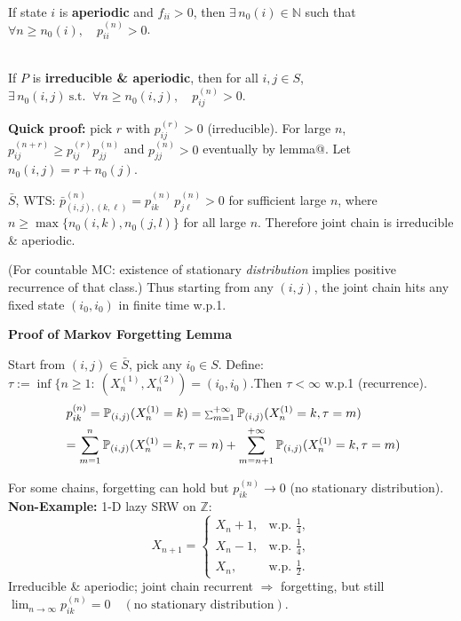 \documentclass[a4paper, landscape]{article}
\newcommand{\topic}[1]{\par\medskip\textbf{#1}\par}
\newcommand{\subtopic}[1]{\par\textbf{#1}}
\newcommand{\smallsum}{\mathop{\scalebox{0.65}{$\sum$}}\nolimits}
\renewcommand{\topic}[1]{\par\medskip\noindent\colorbox{highlightcolor}{\parbox{\dimexpr\columnwidth-2\fboxsep\relax}{\textbf{#1}}}\par}
\renewcommand{\subtopic}[1]{\par\textbf{\color{blue}{#1}}} %
\begin{document}
\begin{multicols}{4}
\subtopic{Lemma@ (eventual return positivity):}\\
If state $i$ is \textbf{aperiodic} and $f_{ii}>0$, then $\exists\, n_0(i)\in\mathbb N$ such that $\forall n\ge n_0(i),\quad p^{(n)}_{ii}>0$.

\subtopic{Corollary@ (eventual positivity between two states):}\\
If $P$ is \textbf{irreducible \& aperiodic}, then for all $i,j\in S$,\\
$\exists\, n_0(i,j)\ \text{s.t. }\ \forall n\ge n_0(i,j),\quad p^{(n)}_{ij}>0.$

\textbf{Quick proof:} pick $r$ with $p^{(r)}_{ij}>0$ (irreducible). For large $n$,
$p^{(n+r)}_{ij}\ge p^{(r)}_{ij}p^{(n)}_{jj}$ and $p^{(n)}_{jj}>0$ eventually by lemma@. Let $n_0(i,j)=r+n_0(j)$.

\subtopic{For joint chain:} $\bar S$, WTS: $\bar p^{(n)}_{(i,j),(k,\ell)} = p^{(n)}_{ik}\,p^{(n)}_{j\ell}>0$ for sufficient large $n$, where $n\geq\max\{n_0(i,k), n_0(j,l)\}$ for all large $n$. Therefore joint chain is irreducible \& aperiodic.
\subtopic{Key step: joint chain has stationary $\bar\pi$ $\Rightarrow$ recurrence:}
(For countable MC: existence of stationary \emph{distribution} implies positive recurrence of that class.) Thus starting from any $(i,j)$, the joint chain hits any fixed state $(i_0,i_0)$ in finite time w.p.1.

\topic{Proof of Markov Forgetting Lemma}
Start from $(i,j) \in \bar S$, pick any $i_0 \in S$. Define: $\tau := \inf\{n\ge 1:\ (X^{(1)}_n,X^{(2)}_n)=(i_0,i_0).$Then $\tau<\infty$ w.p.1 (recurrence).
\begin{align*}
&\;p_{ik}^{(n)}
=\mathbb P_{(i,j)}(X_n^{(1)}=k)    =\smallsum_{m=1}^{+\infty}\mathbb P_{(i,j)}(X_n^{(1)}=k,\tau=m)\\
&=\sum_{m=1}^{n}\mathbb P_{(i,j)}(X_n^{(1)}=k,\tau=n)+\sum_{m=n+1}^{+\infty}\mathbb P_{(i,j)}(X_n^{(1)}=k,\tau=m)
\end{align*}
\vspace{6cm}

\subtopic{Why we need $\exists\,\pi$:}
For some chains, forgetting can hold but $p^{(n)}_{ik}\to 0$ (no stationary distribution).\\
\textbf{Non-Example:} 1-D lazy SRW on $\mathbb Z$:
\[
X_{n+1}=
\begin{cases}
X_n+1, & \text{w.p. } \tfrac14,\\
X_n-1, & \text{w.p. } \tfrac14,\\
X_n, & \text{w.p. } \tfrac12.
\end{cases}
\]
Irreducible \& aperiodic; joint chain recurrent $\Rightarrow$ forgetting, but still $\lim_{n\to\infty}p^{(n)}_{ik}=0 \quad (\text{no stationary distribution}).$


\end{multicols}
\end{document}

